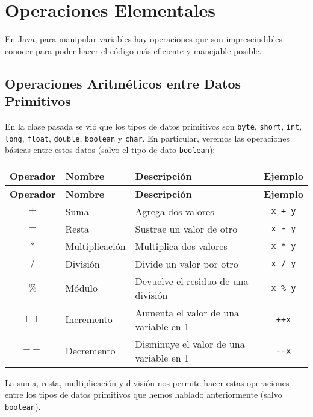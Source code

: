 \documentclass[12pt]{article}
\theoremstyle{largebreak}
\begin{document}
    \section{Operaciones Elementales}

    En Java, para manipular variables hay operaciones que son imprescindibles conocer para poder hacer el código más eficiente y manejable posible.

    \subsection{Operaciones Aritméticos entre Datos Primitivos}

    En la clase pasada se vió que los tipos de datos primitivos son \lstinline|byte|, \lstinline|short|, \lstinline|int|, \lstinline|long|, \lstinline|float|, \lstinline|double|, \lstinline|boolean| y \lstinline|char|. En particular, veremos las operaciones básicas entre estos datos (salvo el tipo de dato \lstinline|boolean|):

    \begin{longtable}{c l p{} c}
    \toprule
    \textbf{Operador} & \textbf{Nombre} & \textbf{Descripción} & \textbf{Ejemplo} \\
    \midrule
    \endfirsthead

    \midrule
    \textbf{Operador} & \textbf{Nombre} & \textbf{Descripción} & \textbf{Ejemplo} \\
    \midrule
    \endhead

    \bottomrule
    \endfoot

        $+$ & Suma & Agrega dos valores & \lstinline|x + y| \\
        $-$ & Resta & Sustrae un valor de otro & \lstinline|x - y| \\
        $*$ & Multiplicación & Multiplica dos valores & \lstinline|x * y| \\
        $/$ & División & Divide un valor por otro & \lstinline|x / y| \\
        $\%$ & Módulo & Devuelve el residuo de una división & \lstinline|x % y| \\
        $++$ & Incremento & Aumenta el valor de una variable en 1 & \lstinline|++x| \\
        $--$ & Decremento & Disminuye el valor de una variable en 1 & \lstinline|--x| \\
    \end{longtable}

    La suma, resta, multiplicación y división nos permite hacer estas operaciones entre los tipos de datos primitivos que hemos hablado anteriormente (salvo \lstinline|boolean|).
\end{document}
